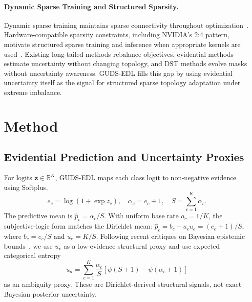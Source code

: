 \documentclass[letterpaper]{article} %
\begin{document}
\paragraph{Dynamic Sparse Training and Structured Sparsity.} Dynamic sparse training maintains sparse connectivity throughout optimization~\cite{dettmers2019sparse,evci2020rigging,li2025pffdst}. Hardware-compatible sparsity constraints, including NVIDIA's 2:4 pattern, motivate structured sparse training and inference when appropriate kernels are used~\cite{mishra2021accelerating,lasby2023srigl}. Existing long-tailed methods rebalance objectives, evidential methods estimate uncertainty without changing topology, and DST methods evolve masks without uncertainty awareness. GUDS-EDL fills this gap by using evidential uncertainty itself as the signal for structured sparse topology adaptation under extreme imbalance.

\section{Method}

\subsection{Evidential Prediction and Uncertainty Proxies}
For logits $\bm{z}\in\mathbb{R}^K$, GUDS-EDL maps each class logit to non-negative evidence using Softplus,
\begin{equation}
e_c=\log(1+\exp z_c),\quad \alpha_c=e_c+1,\quad S=\sum_{c=1}^K\alpha_c .
\end{equation}
The predictive mean is $\hat p_c=\alpha_c/S$. With uniform base rate $a_c=1/K$, the subjective-logic form matches the Dirichlet mean: $\hat p_c=b_c+a_cu_e=(e_c+1)/S$, where $b_c=e_c/S$ and $u_e=K/S$. Following recent critiques on Bayesian epistemic bounds~\cite{shen2024mirage}, we use $u_e$ as a low-evidence structural proxy and use expected categorical entropy
\begin{equation}
u_a=\sum_{c=1}^K\frac{\alpha_c}{S}\left[\psi(S+1)-\psi(\alpha_c+1)\right]
\end{equation}
as an ambiguity proxy. These are Dirichlet-derived structural signals, not exact Bayesian posterior uncertainty.
\end{document}

